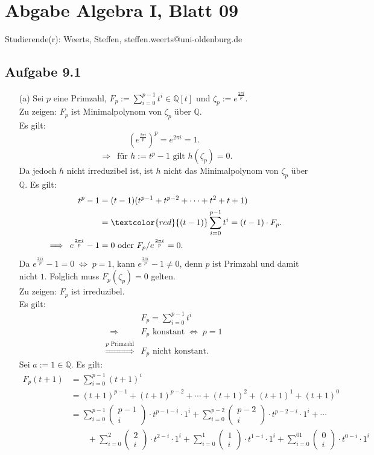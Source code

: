 \documentclass[12pt]{article}
\newcommand{\corr}[1]{\textcolor{red}{#1}}
\newcommand{\df}{\enspace\Longrightarrow\enspace}
\newcommand{\koeff}[2]{\begin{pmatrix}#1 \\ #2\end{pmatrix}}
\newcommand{\gdw}{\;\Longleftrightarrow\;}
\begin{document}
\section*{Abgabe Algebra I, Blatt 09}

Studierende(r): Weerts, Steffen, steffen.weerts@uni-oldenburg.de

\subsection*{Aufgabe 9.1}
\begin{enumerate}
	\item[(a)] Sei $p$ eine Primzahl, $F_p:=\sum_{i=0}^{p-1}t^i\in\mathbb{Q}[t]$ und $\zeta_p:=e^{\frac{2\pi i}{p}}$. \\
	Zu zeigen: $F_p$ ist Minimalpolynom von $\zeta_p$ über $\mathbb{Q}$. \\
	Es gilt:
	$$\left(e^{\frac{2\pi i}{p}}\right)^p=e^{2\pi i}=1.$$
	$$\df\text{für }h:=t^p-1\text{ gilt }h(\zeta_p)=0.$$
	Da jedoch $h$ nicht irreduzibel ist, ist $h$ nicht das Minimalpolynom von $\zeta_p$ über $\mathbb{Q}$. Es gilt:
	\begin{align*}
		t^p-1&=(t-1)(t^{p-1}+t^{p-2}+\cdots+t^2+t+1) \\
		&=\corr{(t-1)}\sum_{i=0}^{p-1}t^i=(t-1)\cdot F_p. \\
		\df e^{\frac{2\pi i}{p}}-1&=0\text{ oder }F_p/e^{\frac{2\pi i}{p}}=0.
	\end{align*}		
	Da $e^{\frac{2\pi i}{p}}-1=0\gdw p=1$, kann $e^{\frac{2\pi i}{p}}-1\neq0$, denn $p$ ist Primzahl und damit nicht $1$. Folglich muss $F_p(\zeta_p)=0$ gelten. \\
	Zu zeigen: $F_p$ ist irreduzibel. \\
	Es gilt:
	\begin{align*}
		&F_p=\sum_{i=0}^{p-1}t^i \\
		\df&F_p\text{ konstant}\gdw p=1 \\
		\overset{p\text{ Primzahl}}{\df}&F_p\text{ nicht konstant}.
	\end{align*}
	Sei $a:=1\in\mathbb{Q}$. Es gilt:
	\begin{align*}
		F_p(t+1)&=\sum_{i=0}^{p-1}(t+1)^i \\
		&=(t+1)^{p-1}+(t+1)^{p-2}+\cdots+(t+1)^2+(t+1)^1+(t+1)^0 \\
		&=\sum_{i=0}^{p-1}\koeff{p-1}{i}\cdot t^{p-1-i}\cdot1^i+\sum_{i=0}^{p-2}\koeff{p-2}{i}\cdot t^{p-2-i}\cdot1^i+\cdots \\
		&\quad\quad+\sum_{i=0}^{2}\koeff{2}{i}\cdot t^{2-i}\cdot1^i+\sum_{i=0}^{1}\koeff{1}{i}\cdot t^{1-i}\cdot1^i+\sum_{i=0}^{01}\koeff{0}{i}\cdot t^{0-i}\cdot1^i \\

\end{align*}
\end{enumerate}
\end{document}
